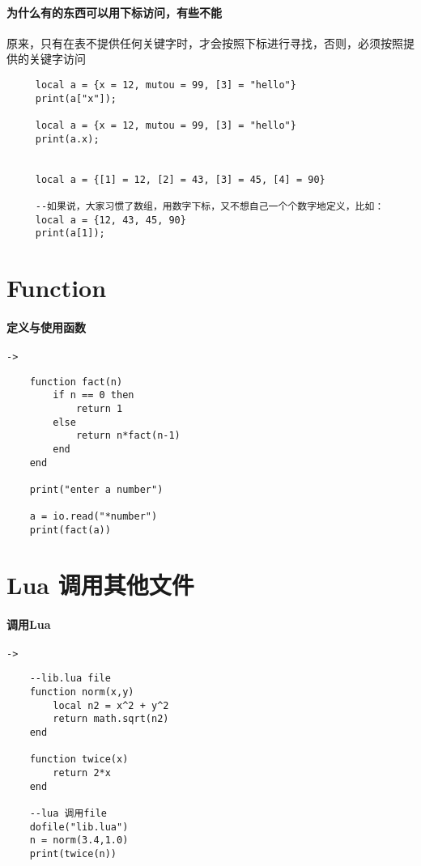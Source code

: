 \documentclass[UTF8,a4paper,12pt]{ctexart}
\begin{document}
	\paragraph{为什么有的东西可以用下标访问，有些不能}
			原来，只有在表不提供任何关键字时，才会按照下标进行寻找，否则，必须按照提供的关键字访问
			 \begin{lstlisting}
	 local a = {x = 12, mutou = 99, [3] = "hello"}
	 print(a["x"]);
	 
	 local a = {x = 12, mutou = 99, [3] = "hello"}
	 print(a.x);
	 
	 
	 local a = {[1] = 12, [2] = 43, [3] = 45, [4] = 90}
	 
	 --如果说，大家习惯了数组，用数字下标，又不想自己一个个数字地定义，比如：
	 local a = {12, 43, 45, 90}
	 print(a[1]);
			  \end{lstlisting}
\newpage
\section{Function}
	\paragraph{定义与使用函数}\verb|->|
		 \begin{lstlisting}
	function fact(n)
		if n == 0 then
			return 1
		else
			return n*fact(n-1)
		end
	end
		
	print("enter a number")
	
	a = io.read("*number")
	print(fact(a))
		 \end{lstlisting}
\newpage
\section{Lua 调用其他文件}
	\paragraph{调用Lua}\verb|->|
	 \begin{lstlisting}
	--lib.lua file
	function norm(x,y)
		local n2 = x^2 + y^2
		return math.sqrt(n2)
	end
	
	function twice(x)
		return 2*x
	end
	
	--lua 调用file
	dofile("lib.lua")
	n = norm(3.4,1.0)
	print(twice(n))	 
	 \end{lstlisting}
\end{document}
